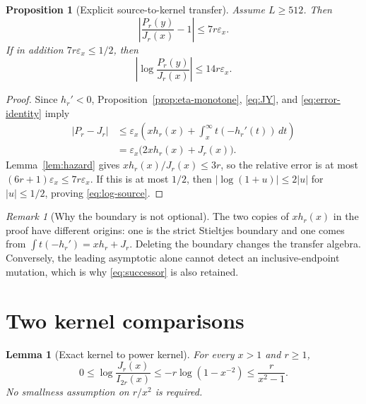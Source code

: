 \documentclass[11pt]{article}
\newtheorem{proposition}[theorem]{Proposition}
\newtheorem{lemma}[theorem]{Lemma}
\theoremstyle{definition}
\theoremstyle{remark}
\newtheorem{remark}[theorem]{Remark}
\newcommand{\eps}{\varepsilon}
\begin{document}
\begin{proposition}[Explicit source-to-kernel transfer]
\label{prop:source-transfer}
Assume $L\ge512$.  Then
\begin{equation}
 \left|\frac{P_r(y)}{J_r(x)}-1\right|\le7r\eps_x.
 \label{eq:relative-source}
\end{equation}
If in addition $7r\eps_x\le1/2$, then
\begin{equation}
 \boxed{\left|\log\frac{P_r(y)}{J_r(x)}\right|
 \le14r\eps_x.}
 \label{eq:log-source}
\end{equation}
\end{proposition}

\begin{proof}
Since $h_r'<0$, Proposition~\ref{prop:eta-monotone},
\eqref{eq:JY}, and \eqref{eq:error-identity} imply
\begin{align*}
 |P_r-J_r|
 &\le\eps_x\left(xh_r(x)+
       \int_x^\infty t(-h_r'(t))\,dt\right)\\
 &=\eps_x\bigl(2xh_r(x)+J_r(x)\bigr).
\end{align*}
Lemma~\ref{lem:hazard} gives $xh_r(x)/J_r(x)\le3r$, so the relative
error is at most $(6r+1)\eps_x\le7r\eps_x$.  If this is at most $1/2$,
then $|\log(1+u)|\le2|u|$ for $|u|\le1/2$, proving
\eqref{eq:log-source}.
\end{proof}

\begin{remark}[Why the boundary is not optional]
The two copies of $xh_r(x)$ in the proof have different origins: one is
the strict Stieltjes boundary and one comes from
$\int t(-h_r')=xh_r+J_r$.  Deleting the boundary changes the transfer
algebra.  Conversely, the leading asymptotic alone cannot detect an
inclusive-endpoint mutation, which is why \eqref{eq:successor} is also
retained.
\end{remark}

\section{Two kernel comparisons}

\begin{lemma}[Exact kernel to power kernel]
\label{lem:J-I}
For every $x>1$ and $r\ge1$,
\begin{equation}
 0\le\log\frac{J_r(x)}{I_{2r}(x)}
 \le-r\log(1-x^{-2})
 \le\frac{r}{x^2-1}.
 \label{eq:J-I}
\end{equation}
No smallness assumption on $r/x^2$ is required.
\end{lemma}
\end{document}
